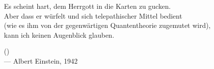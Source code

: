 \begin{flushright}
\itshape
\begin{hangleftquote}{\QDEOpen}{\QDEClose}
Es scheint hart, dem Herrgott in die Karten zu gucken.\\
Aber dass er würfelt und sich telepathischer Mittel bedient\\
(wie es ihm von der gegenwärtigen Quantentheorie zugemutet wird),\\
kann ich keinen Augenblick glauben.
\end{hangleftquote}
\par\smallskip
\normalfont ()\\
— Albert Einstein, 1942
\end{flushright}
